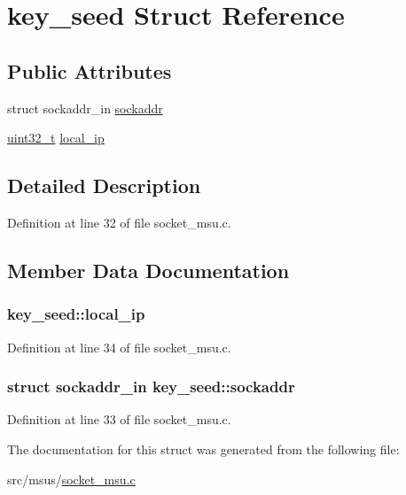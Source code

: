 \hypertarget{structkey__seed}{\section{key\-\_\-seed Struct Reference}
\label{structkey__seed}
}
\subsection*{Public Attributes}
\begin{DoxyCompactItemize}
\item 
struct sockaddr\-\_\-in \hyperlink{structkey__seed_a48fd81b209ca6e3c9bc8a7378fbab98d}{sockaddr}
\item 
\hyperlink{msus_2webserver_2uthash_8h_a435d1572bf3f880d55459d9805097f62}{uint32\-\_\-t} \hyperlink{structkey__seed_a32d3db48f32118ec135d3e1778a97270}{local\-\_\-ip}
\end{DoxyCompactItemize}


\subsection{Detailed Description}


Definition at line 32 of file socket\-\_\-msu.\-c.



\subsection{Member Data Documentation}
\hypertarget{structkey__seed_a32d3db48f32118ec135d3e1778a97270}{
\subsubsection[{local\-\_\-ip}]{ key\-\_\-seed\-::local\-\_\-ip}}\label{structkey__seed_a32d3db48f32118ec135d3e1778a97270}


Definition at line 34 of file socket\-\_\-msu.\-c.

\hypertarget{structkey__seed_a48fd81b209ca6e3c9bc8a7378fbab98d}{
\subsubsection[{sockaddr}]{\setlength{\rightskip}{0pt plus 5cm}struct sockaddr\-\_\-in key\-\_\-seed\-::sockaddr}}\label{structkey__seed_a48fd81b209ca6e3c9bc8a7378fbab98d}


Definition at line 33 of file socket\-\_\-msu.\-c.



The documentation for this struct was generated from the following file\-:\begin{DoxyCompactItemize}
\item 
src/msus/\hyperlink{socket__msu_8c}{socket\-\_\-msu.\-c}\end{DoxyCompactItemize}
